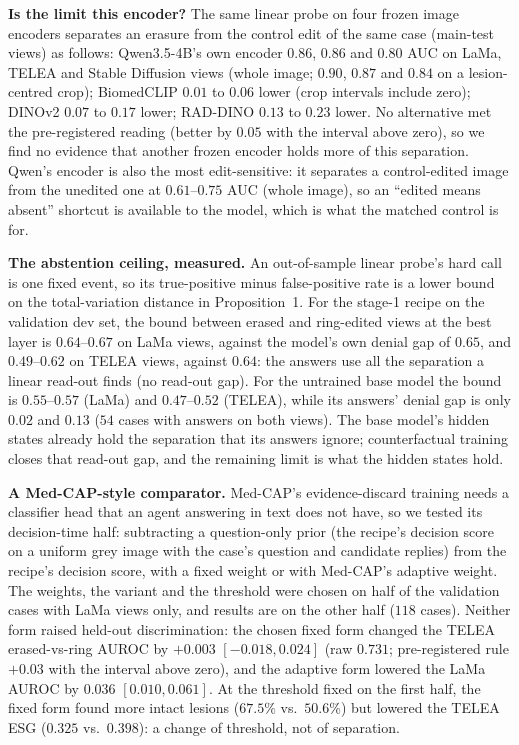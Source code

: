 \documentclass[5p,times,twocolumn,authoryear]{elsarticle}
\begin{document}
\textbf{Is the limit this encoder?} The same linear probe on four frozen image encoders separates an erasure from the control edit of the same case (main-test views) as follows: Qwen3.5-4B's own encoder $0.86$, $0.86$ and $0.80$ AUC on LaMa, TELEA and Stable Diffusion views (whole image; $0.90$, $0.87$ and $0.84$ on a lesion-centred crop); BiomedCLIP $0.01$ to $0.06$ lower (crop intervals include zero); DINOv2 $0.07$ to $0.17$ lower; RAD-DINO $0.13$ to $0.23$ lower. No alternative met the pre-registered reading (better by $0.05$ with the interval above zero), so we find no evidence that another frozen encoder holds more of this separation. Qwen's encoder is also the most edit-sensitive: it separates a control-edited image from the unedited one at $0.61$--$0.75$ AUC (whole image), so an ``edited means absent'' shortcut is available to the model, which is what the matched control is for.

\textbf{The abstention ceiling, measured.} An out-of-sample linear probe's hard call is one fixed event, so its true-positive minus false-positive rate is a lower bound on the total-variation distance in Proposition~1. For the stage-1 recipe on the validation dev set, the bound between erased and ring-edited views at the best layer is $0.64$--$0.67$ on LaMa views, against the model's own denial gap of $0.65$, and $0.49$--$0.62$ on TELEA views, against $0.64$: the answers use all the separation a linear read-out finds (no read-out gap). For the untrained base model the bound is $0.55$--$0.57$ (LaMa) and $0.47$--$0.52$ (TELEA), while its answers' denial gap is only $0.02$ and $0.13$ ($54$ cases with answers on both views). The base model's hidden states already hold the separation that its answers ignore; counterfactual training closes that read-out gap, and the remaining limit is what the hidden states hold.

\textbf{A Med-CAP-style comparator.} Med-CAP's evidence-discard training needs a classifier head that an agent answering in text does not have, so we tested its decision-time half: subtracting a question-only prior (the recipe's decision score on a uniform grey image with the case's question and candidate replies) from the recipe's decision score, with a fixed weight or with Med-CAP's adaptive weight. The weights, the variant and the threshold were chosen on half of the validation cases with LaMa views only, and results are on the other half ($118$ cases). Neither form raised held-out discrimination: the chosen fixed form changed the TELEA erased-vs-ring AUROC by $+0.003$ $[-0.018, 0.024]$ (raw $0.731$; pre-registered rule $+0.03$ with the interval above zero), and the adaptive form lowered the LaMa AUROC by $0.036$ $[0.010, 0.061]$. At the threshold fixed on the first half, the fixed form found more intact lesions ($67.5\%$ vs.\ $50.6\%$) but lowered the TELEA ESG ($0.325$ vs.\ $0.398$): a change of threshold, not of separation.
\end{document}
